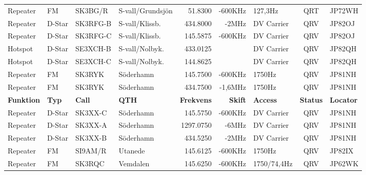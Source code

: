 \begin{landscape}
\begin{longtable}{llllrrlcl}
	Repeater          & FM           & SK3BG/R       & S-vall/Grundsjön &           51.8300 &        -600KHz & 127,3Hz         &       QRT       & JP72WH           \\
	Repeater          & D-Star       & SK3RFG-B      & S-vall/Klissb.   &          434.8000 &          -2MHz & DV Carrier      &       QRV       & JP82OJ           \\
	Repeater          & D-Star       & SK3RFG-C      & S-vall/Klissb.   &          145.5875 &        -600KHz & DV Carrier      &       QRV       & JP82OJ           \\
	Hotspot           & D-Star       & SE3XCH-B      & S-vall/Nolbyk.   &          433.0125 &                & DV Carrier      &       QRV       & JP82QH           \\
	Hotspot           & D-Star       & SE3XCH-C      & S-vall/Nolbyk.   &          144.8625 &                & DV Carrier      &       QRV       & JP82QH           \\
	Repeater          & FM           & SK3RYK        & Söderhamn        &          145.7500 &        -600KHz & 1750Hz          &       QRV       & JP81NH           \\
	Repeater          & FM           & SK3RYK        & Söderhamn        &          434.7500 &        -1,6MHz & 1750Hz          &       QRV       & JP81NH           \\
	\textbf{Funktion} & \textbf{Typ} & \textbf{Call} & \textbf{QTH}     & \textbf{Frekvens} & \textbf{Skift} & \textbf{Access} & \textbf{Status} & \textbf{Locator} \\ \hline
	Repeater          & D-Star       & SK3XX-C       & Söderhamn        &          145.5750 &        -600KHz & DV Carrier      &       QRV       & JP81NH           \\
	Repeater          & D-Star       & SK3XX-A       & Söderhamn        &         1297.0750 &          -6MHz & DV Carrier      &       QRV       & JP81NH           \\
	Repeater          & D-Star       & SK3XX-B       & Söderhamn        &          434.5250 &          -2MHz & DV Carrier      &       QRV       & JP81NH           \\
	Repeater          & FM           & SI9AM/R       & Utanede          &          145.6125 &        -600KHz & 1750Hz          &       QRV       & JP82IX           \\
	Repeater          & FM           & SK3RQC        & Vemdalen         &          145.6250 &        -600KHz & 1750/74,4Hz     &       QRV       & JP62WK           \\

\end{longtable}
\end{landscape}
